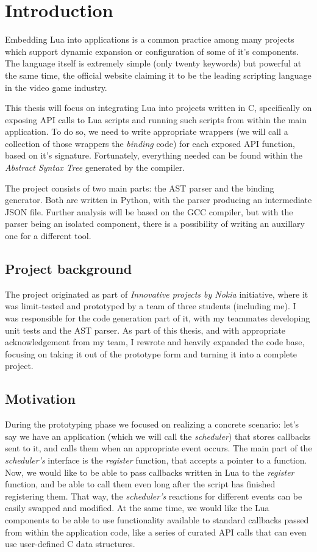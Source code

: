 \documentclass[polish, english]{iithesis}
\author{Mateusz Łuczyński}
\date{\today}
\begin{document}
\chapter{Introduction}
Embedding Lua into applications is a common practice among many projects which support dynamic expansion or configuration of some of it's components.
The language itself is extremely simple (only twenty keywords) but powerful at the same time, the official website claiming it to be the leading scripting language in the video game industry.

This thesis will focus on integrating Lua into projects written in C, specifically on exposing API calls to Lua scripts and running such scripts from within the main application.
To do so, we need to write appropriate wrappers (we will call a collection of those wrappers the \textit{binding} code) for each exposed API function, based on it's signature.
Fortunately, everything needed can be found within the \textit{Abstract Syntax Tree} generated by the compiler. 

The project consists of two main parts: the AST parser and the binding generator.
Both are written in Python, with the parser producing an intermediate JSON file.
Further analysis will be based on the GCC compiler, but with the parser being an isolated component, there is a possibility of writing an auxillary one for a different tool.

  \section{Project background}
The project originated as part of \textit{Innovative projects by Nokia} initiative, where it was limit-tested and prototyped by a team of three students (including me).
I was responsible for the code generation part of it, with my teammates developing unit tests and the AST parser. 
As part of this thesis, and with appropriate acknowledgement from my team, I rewrote and heavily expanded the code base, focusing on taking it out of the prototype form and turning it into a complete project.
  \section{Motivation}
During the prototyping phase we focused on realizing a concrete scenario: 
let's say we have an application (which we will call the \textit{scheduler}) that stores callbacks sent to it, and calls them when an appropriate event occurs.
The main part of the \textit{scheduler's} interface is the \textit{register} function, that accepts a pointer to a function.
Now, we would like to be able to pass callbacks written in Lua to the \textit{register} function, and be able to call them even long after the script has finished registering them. 
That way, the \textit{scheduler's} reactions for different events can be easily swapped and modified. 
At the same time, we would like the Lua components to be able to use functionality available to standard callbacks passed from within the application code, like a series of curated API calls that can even use user-defined C data structures.
\end{document}
